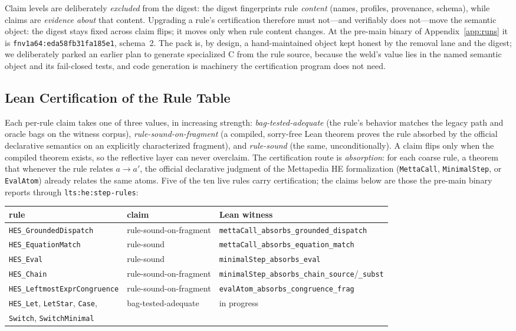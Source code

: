 \documentclass[11pt]{article}
\newcommand{\code}[1]{\texttt{#1}}
\newcommand{\HE}{\textup{HE}}
\begin{document}
Claim levels are deliberately \emph{excluded} from the digest: the
digest fingerprints rule \emph{content} (names, profiles, provenance,
schema), while claims are \emph{evidence about} that content.
Upgrading a rule's certification therefore must not---and verifiably
does not---move the semantic object: the digest
stays fixed across claim flips; it moves only when rule content
changes.  At the pre-main binary of Appendix~\ref{app:runs} it is
\code{fnv1a64:eda58fb31fa185e1}, schema~2.  The pack is, by design, a hand-maintained
object kept honest by the removal lane and the digest; we deliberately
parked an earlier plan to generate specialized C from the rule source,
because the weld's value lies in the named semantic object and its
fail-closed tests, and code generation is machinery the certification
program does not need.

\subsection{Lean Certification of the Rule Table}
\label{sec:rulecert}

Each per-rule claim takes one of three values, in increasing strength:
\emph{bag-tested-adequate} (the rule's behavior matches the legacy
path and oracle bags on the witness corpus),
\emph{rule-sound-on-fragment} (a compiled, sorry-free Lean theorem
proves the rule absorbed by the official declarative semantics on an
explicitly characterized fragment), and \emph{rule-sound} (the same,
unconditionally).  A claim flips only when the compiled theorem
exists, so the reflective layer can never overclaim.  The
certification route is \emph{absorption}: for each coarse rule, a
theorem that whenever the rule relates $a \to a'$, the official
declarative judgment of the Mettapedia \HE{} formalization
(\code{MettaCall}, \code{MinimalStep}, or \code{EvalAtom}) already
relates the same atoms.  Five of the ten live rules carry
certification; the claims below are those the pre-main binary reports
through \code{lts:he:step-rules}:

\begin{center}\footnotesize
\begin{tabular}{lll}
\toprule
rule & claim & Lean witness \\
\midrule
\code{HES\_GroundedDispatch} & rule-sound-on-fragment &
  \code{mettaCall\_absorbs\_grounded\_dispatch} \\
\code{HES\_EquationMatch} & rule-sound &
  \code{mettaCall\_absorbs\_equation\_match} \\
\code{HES\_Eval} & rule-sound &
  \code{minimalStep\_absorbs\_eval} \\
\code{HES\_Chain} & rule-sound-on-fragment &
  \code{minimalStep\_absorbs\_chain\_source}/\code{\_subst} \\
\code{HES\_LeftmostExprCongruence} & rule-sound-on-fragment &
  \code{evalAtom\_absorbs\_congruence\_frag} \\
\code{HES\_Let}, \code{LetStar}, \code{Case}, & bag-tested-adequate &
  in progress \\
\quad\code{Switch}, \code{SwitchMinimal} & & \\
\bottomrule
\end{tabular}
\end{center}
\end{document}
